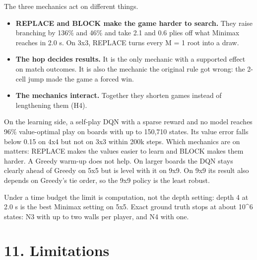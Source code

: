 \documentclass[11pt]{article}
\begin{document}
The three mechanics act on different things.

\begin{itemize}
\item \textbf{REPLACE and BLOCK make the game harder to search.} They raise branching by 136\% and 46\%
and take 2.1 and 0.6 plies off what Minimax reaches in 2.0 s. On 3x3, REPLACE turns every
M = 1 root into a draw.
\item \textbf{The hop decides results.} It is the only mechanic with a supported effect on match
outcomes. It is also the mechanic the original rule got wrong: the 2-cell jump made the game
a forced win.
\item \textbf{The mechanics interact.} Together they shorten games instead of lengthening them (H4).
\end{itemize}

On the learning side, a self-play DQN with a sparse reward and no model reaches 96\% value-optimal
play on boards with up to 150,710 states. Its value error falls below 0.15 on 4x4 but not on 3x3
within 200k steps. Which mechanics are on matters: REPLACE makes the values easier to learn and
BLOCK makes them harder. A Greedy warm-up does not help. On larger boards the DQN stays
clearly ahead of Greedy on 5x5 but is level with it on 9x9. On 9x9 its result also depends on
Greedy's tie order, so the 9x9 policy is the least robust.

Under a time budget the limit is computation, not the depth setting: depth 4 at 2.0 s is the
best Minimax setting on 5x5. Exact ground truth stops at about 10\textasciicircum{}6 states: N3 with up to two
walls per player, and N4 with one.

\section{11. Limitations}
\end{document}

